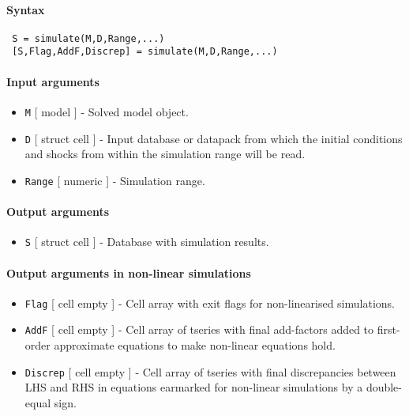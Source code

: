 


	\paragraph{Syntax}
 
 \begin{verbatim}
 S = simulate(M,D,Range,...)
 [S,Flag,AddF,Discrep] = simulate(M,D,Range,...)
 \end{verbatim}
 
 \paragraph{Input arguments}
 
 \begin{itemize}
 \item
   \texttt{M} {[} model {]} - Solved model object.
 \item
   \texttt{D} {[} struct \textbar{} cell {]} - Input database or datapack
   from which the initial conditions and shocks from within the
   simulation range will be read.
 \item
   \texttt{Range} {[} numeric {]} - Simulation range.
 \end{itemize}
 
 \paragraph{Output arguments}
 
 \begin{itemize}
 \item
   \texttt{S} {[} struct \textbar{} cell {]} - Database with simulation
   results.
 \end{itemize}
 
 \paragraph{Output arguments in non-linear simulations}
 
 \begin{itemize}
 \item
   \texttt{Flag} {[} cell \textbar{} empty {]} - Cell array with exit
   flags for non-linearised simulations.
 \item
   \texttt{AddF} {[} cell \textbar{} empty {]} - Cell array of tseries
   with final add-factors added to first-order approximate equations to
   make non-linear equations hold.
 \item
   \texttt{Discrep} {[} cell \textbar{} empty {]} - Cell array of tseries
   with final discrepancies between LHS and RHS in equations earmarked
   for non-linear simulations by a double-equal sign.
 \end{itemize}
 

